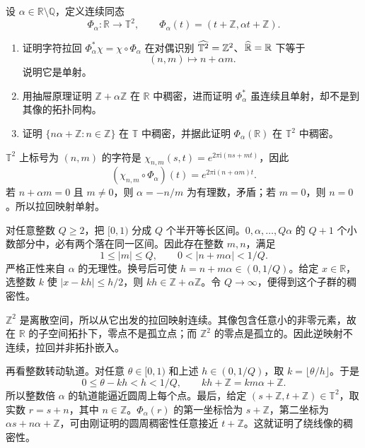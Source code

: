 \begin{exercise}[无理绕线的字符拉回]
\label{b2:ex:I3-irrational-winding}
设 \(\alpha\in\mathbb R\setminus\mathbb Q\)，定义连续同态
\[
 \Phi_\alpha:\mathbb R\longrightarrow\mathbb T^2,\qquad
 \Phi_\alpha(t)=(t+\mathbb Z,\alpha t+\mathbb Z).
\]
\begin{enumerate}
\item\label{b2:item:I3-winding-pullback}
证明字符拉回 \(\Phi_\alpha^*\chi=\chi\circ\Phi_\alpha\) 在对偶识别
\(\widehat{\mathbb T^2\kern0pt}=\mathbb Z^2\)、\(\widehat{\mathbb R\kern0pt}=\mathbb R\) 下等于
\[
 (n,m)\longmapsto n+\alpha m.
\]
说明它是单射。
\item\label{b2:item:I3-winding-density}
用抽屉原理证明 \(\mathbb Z+\alpha\mathbb Z\) 在 \(\mathbb R\) 中稠密，进而证明 \(\Phi_\alpha^*\) 虽连续且单射，却不是到其像的拓扑同构。
\item\label{b2:item:I3-winding-orbit}
证明 \(\{n\alpha+\mathbb Z:n\in\mathbb Z\}\) 在 \(\mathbb T\) 中稠密，并据此证明 \(\Phi_\alpha(\mathbb R)\) 在 \(\mathbb T^2\) 中稠密。
\end{enumerate}
\end{exercise}
\begin{solution}
\(\mathbb T^2\) 上标号为 \((n,m)\) 的字符是
\(\chi_{n,m}(s,t)=e^{2\pi\mathrm i(ns+mt)}\)，因此
\[
 (\chi_{n,m}\circ\Phi_\alpha)(t)
 =e^{2\pi\mathrm i(n+\alpha m)t}.
\]
若 \(n+\alpha m=0\) 且 \(m\ne0\)，则 \(\alpha=-n/m\) 为有理数，矛盾；若 \(m=0\)，则 \(n=0\)。所以拉回映射单射。

对任意整数 \(Q\ge2\)，把 \([0,1)\) 分成 \(Q\) 个半开等长区间。\(0,\alpha,\ldots,Q\alpha\) 的 \(Q+1\) 个小数部分中，必有两个落在同一区间。因此存在整数 \(m,n\)，满足
\[
 1\le |m|\le Q,\qquad 0<|n+m\alpha|<1/Q.
\]
严格正性来自 \(\alpha\) 的无理性。换号后可使
\(h=n+m\alpha\in(0,1/Q)\)。给定 \(x\in\mathbb R\)，选整数 \(k\) 使 \(|x-kh|\le h/2\)，则 \(kh\in\mathbb Z+\alpha\mathbb Z\)。令 \(Q\to\infty\)，便得到这个子群的稠密性。

\(\mathbb Z^2\) 是离散空间，所以从它出发的拉回映射连续。其像包含任意小的非零元素，故在 \(\mathbb R\) 的子空间拓扑下，零点不是孤立点；而 \(\mathbb Z^2\) 的零点是孤立的。因此逆映射不连续，拉回并非拓扑嵌入。

再看整数转动轨道。对任意 \(\theta\in[0,1)\) 和上述 \(h\in(0,1/Q)\)，取 \(k=\lfloor\theta/h\rfloor\)。于是
\[
 0\le\theta-kh<h<1/Q,\qquad
 kh+\mathbb Z=km\alpha+\mathbb Z.
\]
所以整数倍 \(\alpha\) 的轨道能逼近圆周上每个点。最后，给定 \((s+\mathbb Z,t+\mathbb Z)\in\mathbb T^2\)，取实数 \(r=s+n\)，其中 \(n\in\mathbb Z\)。\(\Phi_\alpha(r)\) 的第一坐标恰为 \(s+\mathbb Z\)，第二坐标为
\(\alpha s+n\alpha+\mathbb Z\)，可由刚证明的圆周稠密性任意接近 \(t+\mathbb Z\)。这就证明了绕线像的稠密性。
\end{solution}


